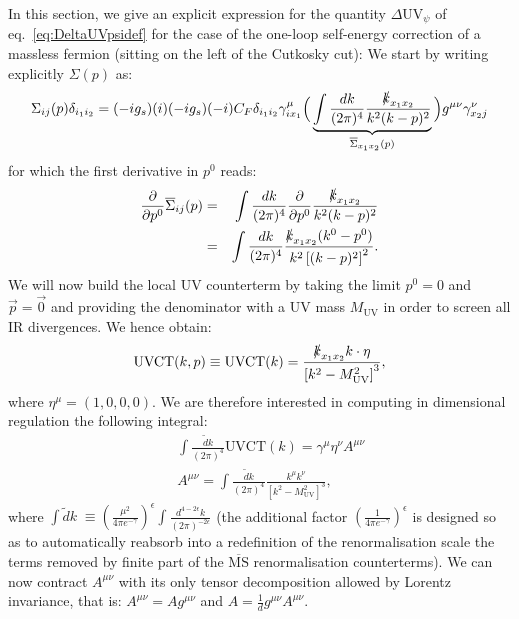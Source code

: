 \documentclass[11pt]{article}
\begin{document}
In this section, we give an explicit expression for the quantity $\Delta \textrm{UV}_{\psi}$ of eq.~\eqref{eq:DeltaUVpsidef} for the case of the one-loop self-energy correction of a massless fermion (sitting on the left of the Cutkosky cut):
We start by writing explicitly $\Sigma(p)$ as:
\begin{equation}
\Sigma_{ij}(p) \delta_{i_1 i_2} = (-i g_s) (i) (-i g_s )(-i ) C_F \delta_{i_1 i_2} \gamma_{i x_1}^\mu {\Big(} 
\underbrace{
\int \frac{d k}{(2\pi)^4} \frac{\slashed{k}_{x_1 x_2}}{k^2 (k-p)^2}
}_{\overline{\Sigma}_{x_1 x_2}(p)}
\Big{)} g^{\mu\nu}\gamma^\nu_{x_2 j}
\end{equation}
for which the first derivative in $p^0$ reads:
\begin{eqnarray}
\frac{\partial}{\partial p^0} \overline{\Sigma}_{ij}(p)
&=&\int \frac{d k}{(2\pi)^4} \frac{\partial}{\partial p^0} \frac{\slashed{k}_{x_1 x_2}}{k^2 (k-p)^2} \nonumber \\
&=& \int \frac{d k}{(2\pi)^4} \frac{ \slashed{k}_{x_1 x_2}(k^0-p^0) }{k^2 \left[(k-p)^2\right]^2}.
\end{eqnarray}
We will now build the local UV counterterm by taking the limit $p^0=0$ and $\vec{p}=\vec{0}$ and providing the denominator with a UV mass $M_\textrm{UV}$ in order to screen all IR divergences. We hence obtain:
\begin{equation}
\textrm{UVCT}(k,p) \equiv \textrm{UVCT}(k) = \frac{ \slashed{k}_{x_1 x_2} k\cdot\eta }{\left[ k^2-M_\textrm{UV}^2\right]^3},
\end{equation}
where $\eta^\mu=(1,0,0,0)$. We are therefore interested in computing in dimensional regulation the following integral:
\begin{eqnarray}
&&\int \frac{\tilde{d} k}{(2\pi)^4} \textrm{UVCT}(k) = \gamma^\mu \eta^\nu A^{\mu\nu} \nonumber\\ 
&&A^{\mu\nu} = \int \frac{\tilde{d} k}{(2\pi)^4} \frac{ k^\mu k^\nu }{\left[ k^2-M_\textrm{UV}^2\right]^3}, \label{Adef}
\end{eqnarray}
where  $\int \tilde{d}k\; \equiv \left(\frac{\mu^2}{4\pi e^{-\gamma}}\right)^{\epsilon} \int \frac{d^{4-2\epsilon}k}{(2\pi)^{-2\epsilon}} $ (the additional factor $ \left(\frac{1}{4\pi e^{-\gamma}}\right)^{\epsilon} $ is designed so as to automatically reabsorb into a redefinition of the renormalisation scale the terms removed by finite part of the $\overline{\textrm{MS}}$ renormalisation counterterms). 
We can now contract $A^{\mu\nu}$ with its only tensor decomposition allowed by Lorentz invariance, that is: $A^{\mu\nu}=A g^{\mu\nu}$ and $A=\frac{1}{d}g^{\mu\nu}A^{\mu\nu}$.
\end{document}
